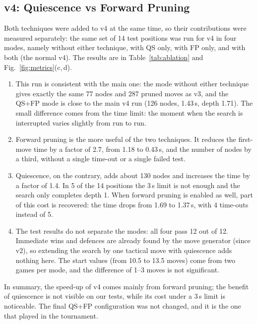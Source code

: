 \documentclass[a4paper,10pt,twocolumn]{article}
\newenvironment{points}{\begin{enumerate}[label=(\arabic*),leftmargin=*,itemsep=2pt,topsep=3pt]}{\end{enumerate}}
\begin{document}
\subsection{v4: Quiescence vs Forward Pruning}\label{sec:ablation}
Both techniques were added to v4 at the same time, so their contributions were measured separately: the same set of 14 test positions was run for v4 in four modes, namely without either technique, with QS only, with FP only, and with both (the normal v4). The results are in Table~\ref{tab:ablation} and Fig.~\ref{fig:metrics}(c,\,d).
\begin{points}
\item This run is consistent with the main one: the mode without either technique gives exactly the same 77 nodes and 287 pruned moves as v3, and the QS+FP mode is close to the main v4 run (126 nodes, 1.43\,s, depth 1.71). The small difference comes from the time limit: the moment when the search is interrupted varies slightly from run to run.
\item Forward pruning is the more useful of the two techniques. It reduces the first-move time by a factor of 2.7, from 1.18 to 0.43\,s, and the number of nodes by a third, without a single time-out or a single failed test.
\item Quiescence, on the contrary, adds about 130 nodes and increases the time by a factor of 1.4. In 5 of the 14 positions the 3\,s limit is not enough and the search only completes depth 1. When forward pruning is enabled as well, part of this cost is recovered: the time drops from 1.69 to 1.37\,s, with 4 time-outs instead of 5.
\item The test results do not separate the modes: all four pass 12 out of 12. Immediate wins and defences are already found by the move generator (since v2), so extending the search by one tactical move with quiescence adds nothing here. The start values (from 10.5 to 13.5 moves) come from two games per mode, and the difference of 1--3 moves is not significant.
\end{points}
In summary, the speed-up of v4 comes mainly from forward pruning; the benefit of quiescence is not visible on our tests, while its cost under a 3\,s limit is noticeable. The final QS+FP configuration was not changed, and it is the one that played in the tournament.
\end{document}
